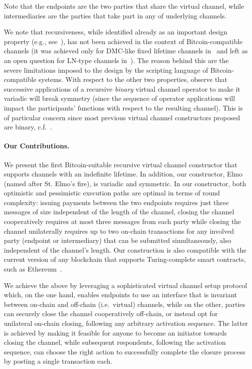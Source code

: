 Note that the endpoints are the two parties that share the virtual channel, while intermediaries are
the parties that take part in any of underlying channels.

We note that recursiveness, while identified already as an important design
property (e.g., see~\cite{DBLP:conf/ccs/DziembowskiFH18}), has not been achieved in the context of Bitcoin-compatible channels 
(it was achieved only for DMC-like fixed lifetime channels in~\cite{10.1007/978-3-030-65411-5_18} and left as an open question for LN-type channels in~\cite{9519487}).
The reason behind this are the severe limitations imposed to the design by the scripting language of Bitcoin-compatible systems. 
%
With respect to the other two properties, observe that successive applications
of a recursive {\em binary} virtual channel operator to make it variadic will
break symmetry (since the sequence of operator applications will impact the
participants' functions with respect to the resulting channel). This is of
particular concern since most previous virtual channel constructors proposed are
binary, c.f.~\cite{DBLP:conf/ccs/DziembowskiFH18,9519487,10.1007/978-3-030-65411-5_18}.

\paragraph{Our Contributions.} We present the first Bitcoin-suitable
recursive virtual channel constructor that supports channels
with an indefinite lifetime. In addition, our constructor, Elmo (named after St.
Elmo's fire), is variadic and symmetric. In our constructor, both optimistic and
pessimistic execution paths are optimal in terms of round complexity: issuing
payments between the two endpoints requires just three messages of size
independent of the length of the channel, closing the channel cooperatively
requires at most three messages from each party while
closing the channel unilaterally requires up to two on-chain transactions for
any involved party (endpoint or intermediary) that can be submitted
simultaneously, also independent of the channel's length. Our
construction is also compatible with the current version of any blockchain that
supports Turing-complete smart contracts, such as
Ethereum~\cite{wood2014ethereum}.

We achieve the above by leveraging a sophisticated virtual channel setup
protocol which, on the one hand, enables endpoints to use an interface that is
invariant between on-chain and off-chain (i.e.\ virtual) channels,
while on the other, parties can securely close the channel cooperatively
off-chain, or instead opt for unilateral on-chain closing, following any arbitrary
activation sequence. The latter is achieved by making it feasible for anyone to
become an initiator towards closing the channel, while subsequent respondents, following the activation sequence, can choose the right action to successfully complete the closure process by posting a single transaction each.

